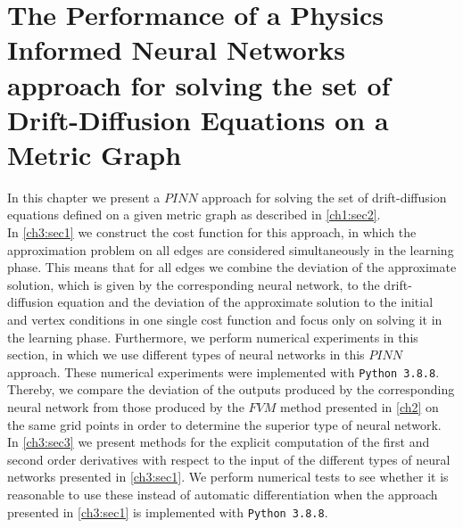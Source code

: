 \chapter{The Performance of a Physics Informed Neural Networks approach for solving the set of Drift-Diffusion Equations on a Metric Graph}
\label{ch3}

In this chapter we present a $PINN$ approach for solving the set of drift-diffusion equations defined on a given metric graph as described in \cref{ch1:sec2}. \\
In \cref{ch3:sec1} we construct the cost function for this approach, in which the approximation problem on all edges are considered simultaneously in the learning phase. This means that for all edges we combine the deviation of the approximate solution, which is given by the corresponding neural network, to the drift-diffusion equation and the deviation of the approximate solution to the initial and vertex conditions in one single cost function and focus only on solving it in the learning phase. Furthermore, we perform numerical experiments in this section, in which we use different types of neural networks in this $PINN$ approach. These numerical experiments were implemented with \lstinline!Python 3.8.8!. Thereby, we compare the deviation of the outputs produced by the corresponding neural network from those produced by the $FVM$ method presented in \cref{ch2} on the same grid points in order to determine the superior type of neural network. \\
In \cref{ch3:sec3} we present methods for the explicit computation of the first and second order derivatives with respect to the input of the different types of neural networks presented in \cref{ch3:sec1}.  We perform numerical tests to see whether it is reasonable to use these instead of automatic differentiation when the approach presented in \cref{ch3:sec1} is implemented with \lstinline!Python 3.8.8!. 



